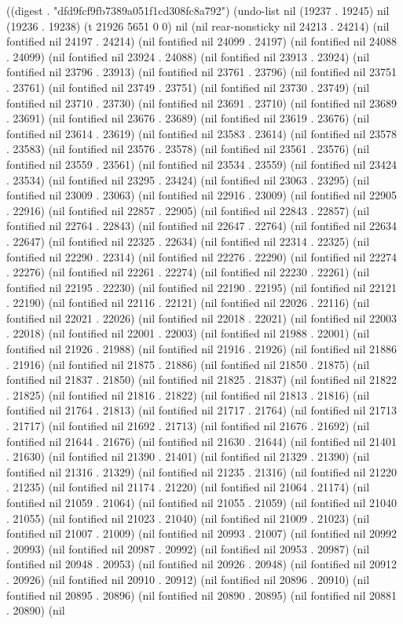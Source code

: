
((digest . "dfd9fcf9fb7389a051f1cd308fc8a792") (undo-list nil (19237 . 19245) nil (19236 . 19238) (t 21926 5651 0 0) nil (nil rear-nonsticky nil 24213 . 24214) (nil fontified nil 24197 . 24214) (nil fontified nil 24099 . 24197) (nil fontified nil 24088 . 24099) (nil fontified nil 23924 . 24088) (nil fontified nil 23913 . 23924) (nil fontified nil 23796 . 23913) (nil fontified nil 23761 . 23796) (nil fontified nil 23751 . 23761) (nil fontified nil 23749 . 23751) (nil fontified nil 23730 . 23749) (nil fontified nil 23710 . 23730) (nil fontified nil 23691 . 23710) (nil fontified nil 23689 . 23691) (nil fontified nil 23676 . 23689) (nil fontified nil 23619 . 23676) (nil fontified nil 23614 . 23619) (nil fontified nil 23583 . 23614) (nil fontified nil 23578 . 23583) (nil fontified nil 23576 . 23578) (nil fontified nil 23561 . 23576) (nil fontified nil 23559 . 23561) (nil fontified nil 23534 . 23559) (nil fontified nil 23424 . 23534) (nil fontified nil 23295 . 23424) (nil fontified nil 23063 . 23295) (nil fontified nil 23009 . 23063) (nil fontified nil 22916 . 23009) (nil fontified nil 22905 . 22916) (nil fontified nil 22857 . 22905) (nil fontified nil 22843 . 22857) (nil fontified nil 22764 . 22843) (nil fontified nil 22647 . 22764) (nil fontified nil 22634 . 22647) (nil fontified nil 22325 . 22634) (nil fontified nil 22314 . 22325) (nil fontified nil 22290 . 22314) (nil fontified nil 22276 . 22290) (nil fontified nil 22274 . 22276) (nil fontified nil 22261 . 22274) (nil fontified nil 22230 . 22261) (nil fontified nil 22195 . 22230) (nil fontified nil 22190 . 22195) (nil fontified nil 22121 . 22190) (nil fontified nil 22116 . 22121) (nil fontified nil 22026 . 22116) (nil fontified nil 22021 . 22026) (nil fontified nil 22018 . 22021) (nil fontified nil 22003 . 22018) (nil fontified nil 22001 . 22003) (nil fontified nil 21988 . 22001) (nil fontified nil 21926 . 21988) (nil fontified nil 21916 . 21926) (nil fontified nil 21886 . 21916) (nil fontified nil 21875 . 21886) (nil fontified nil 21850 . 21875) (nil fontified nil 21837 . 21850) (nil fontified nil 21825 . 21837) (nil fontified nil 21822 . 21825) (nil fontified nil 21816 . 21822) (nil fontified nil 21813 . 21816) (nil fontified nil 21764 . 21813) (nil fontified nil 21717 . 21764) (nil fontified nil 21713 . 21717) (nil fontified nil 21692 . 21713) (nil fontified nil 21676 . 21692) (nil fontified nil 21644 . 21676) (nil fontified nil 21630 . 21644) (nil fontified nil 21401 . 21630) (nil fontified nil 21390 . 21401) (nil fontified nil 21329 . 21390) (nil fontified nil 21316 . 21329) (nil fontified nil 21235 . 21316) (nil fontified nil 21220 . 21235) (nil fontified nil 21174 . 21220) (nil fontified nil 21064 . 21174) (nil fontified nil 21059 . 21064) (nil fontified nil 21055 . 21059) (nil fontified nil 21040 . 21055) (nil fontified nil 21023 . 21040) (nil fontified nil 21009 . 21023) (nil fontified nil 21007 . 21009) (nil fontified nil 20993 . 21007) (nil fontified nil 20992 . 20993) (nil fontified nil 20987 . 20992) (nil fontified nil 20953 . 20987) (nil fontified nil 20948 . 20953) (nil fontified nil 20926 . 20948) (nil fontified nil 20912 . 20926) (nil fontified nil 20910 . 20912) (nil fontified nil 20896 . 20910) (nil fontified nil 20895 . 20896) (nil fontified nil 20890 . 20895) (nil fontified nil 20881 . 20890) (nil 